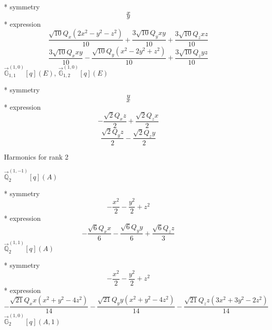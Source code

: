 \documentclass[fleqn,8pt]{jsarticle}
\begin{document}
\noindent\quad ** symmetry
\begin{dmath*}
x
\end{dmath*}
\begin{dmath*}
y
\end{dmath*}
\noindent\quad ** expression
\begin{dmath*}
\frac{\sqrt{10} Q_{x} \left(2 x^{2} - y^{2} - z^{2}\right)}{10} + \frac{3 \sqrt{10} Q_{y} x y}{10} + \frac{3 \sqrt{10} Q_{z} x z}{10}
\end{dmath*}
\begin{dmath*}
\frac{3 \sqrt{10} Q_{x} x y}{10} - \frac{\sqrt{10} Q_{y} \left(x^{2} - 2 y^{2} + z^{2}\right)}{10} + \frac{3 \sqrt{10} Q_{z} y z}{10}
\end{dmath*}
\noindent\quad $\vec{\mathbb{G}}_{1,1}^{(1,0)}[q](E)$, $\vec{\mathbb{G}}_{1,2}^{(1,0)}[q](E)$

\noindent\quad ** symmetry
\begin{dmath*}
y
\end{dmath*}
\begin{dmath*}
x
\end{dmath*}
\noindent\quad ** expression
\begin{dmath*}
- \frac{\sqrt{2} Q_{x} z}{2} + \frac{\sqrt{2} Q_{z} x}{2}
\end{dmath*}
\begin{dmath*}
\frac{\sqrt{2} Q_{y} z}{2} - \frac{\sqrt{2} Q_{z} y}{2}
\end{dmath*}

\noindent * Harmonics for rank 2

\noindent\quad $\vec{\mathbb{Q}}_{2}^{(1,-1)}[q](A)$

\noindent\quad ** symmetry
\begin{dmath*}
- \frac{x^{2}}{2} - \frac{y^{2}}{2} + z^{2}
\end{dmath*}
\noindent\quad ** expression
\begin{dmath*}
- \frac{\sqrt{6} Q_{x} x}{6} - \frac{\sqrt{6} Q_{y} y}{6} + \frac{\sqrt{6} Q_{z} z}{3}
\end{dmath*}
\noindent\quad $\vec{\mathbb{Q}}_{2}^{(1,1)}[q](A)$

\noindent\quad ** symmetry
\begin{dmath*}
- \frac{x^{2}}{2} - \frac{y^{2}}{2} + z^{2}
\end{dmath*}
\noindent\quad ** expression
\begin{dmath*}
- \frac{\sqrt{21} Q_{x} x \left(x^{2} + y^{2} - 4 z^{2}\right)}{14} - \frac{\sqrt{21} Q_{y} y \left(x^{2} + y^{2} - 4 z^{2}\right)}{14} - \frac{\sqrt{21} Q_{z} z \left(3 x^{2} + 3 y^{2} - 2 z^{2}\right)}{14}
\end{dmath*}
\noindent\quad $\vec{\mathbb{G}}_{2}^{(1,0)}[q](A,1)$
\end{document}
